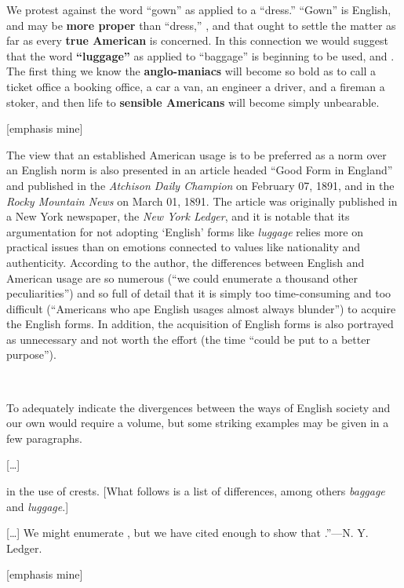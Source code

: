 \begin{ipquote}
{We protest against the word “gown” as applied to a “dress.” “Gown” is English, and may be \textbf{more proper} than “dress,” , and that ought to settle the matter as far as every \textbf{true American} is concerned. In this connection we would suggest that the word \textbf{“luggage”} as applied to “baggage” is beginning to be used, and . The first thing we know the \textbf{anglo-maniacs} will become so bold as to call a ticket office a booking office, a car a van, an engineer a driver, and a fireman a stoker, and then life to \textbf{sensible Americans} will become simply unbearable.

\raggedleft
{[emphasis mine]}\\
}
\end{ipquote}

The view that an established American usage is to be preferred as a norm over an English norm is also presented in an article headed “Good Form in England” and published in the \emph{Atchison Daily Champion} on February 07, 1891, and in the \emph{Rocky Mountain News} on March 01, 1891. The article was originally published in a New York newspaper, the \emph{New York Ledger}, and it is notable that its argumentation for not adopting ‘English’ forms like \emph{luggage} relies more on practical issues than on emotions connected to values like nationality and authenticity. According to the author, the differences between English and American usage are so numerous (“we could enumerate a thousand other peculiarities”) and so full of detail that it is simply too time-consuming and too difficult (“Americans who ape English usages almost always blunder”) to acquire the English forms. In addition, the acquisition of English forms is also portrayed as unnecessary and not worth the effort (the time “could be put to a better purpose”).

\begin{ipquote}
\begin{center}
\\
\end{center}
{To adequately indicate the divergences between the ways of English society and our own would require a volume, but some striking examples may be given in a few paragraphs.

\centering
{[…]}

 in the use of crests. [What follows is a list of differences, among others \textit{baggage} and \textit{luggage}.]}

{[…] We might enumerate , but we have cited enough to show that .”—N. Y. Ledger.

\raggedleft
{[emphasis mine]}\\
}
\end{ipquote}

